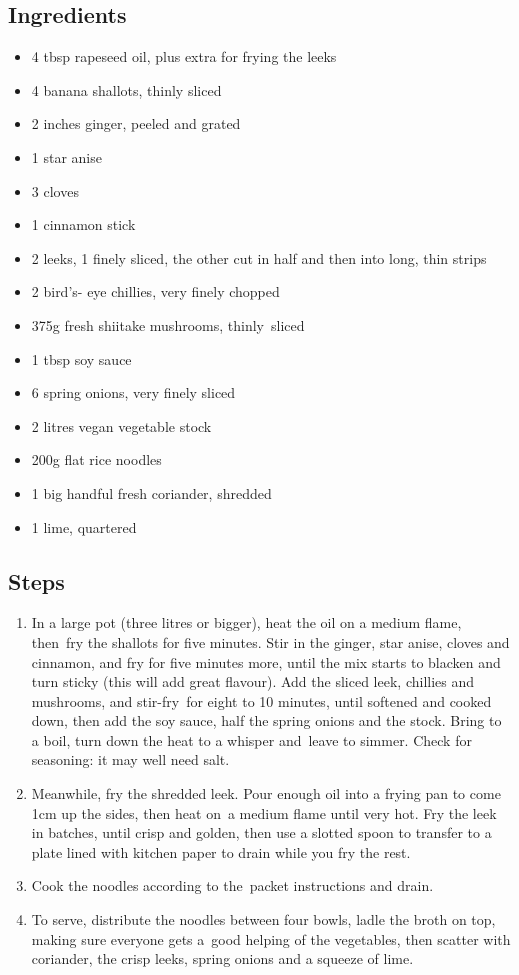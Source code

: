 \documentclass{book}
\begin{document}
\subsection*{Ingredients}
\begin{itemize}
\item 4 tbsp rapeseed oil, plus extra for frying the leeks
\item 4 banana shallots, thinly sliced 
\item 2 inches ginger, peeled and grated 
\item 1 star anise 
\item 3 cloves
\item 1 cinnamon stick 
\item 2 leeks, 1 finely sliced, the other cut in half and then into long, thin strips 
\item 2 bird’s- eye chillies, very finely chopped 
\item 375g fresh shiitake mushrooms, thinly sliced 
\item 1 tbsp soy sauce 
\item 6 spring onions, very finely sliced 
\item 2 litres vegan vegetable stock
\item 200g flat rice noodles
\item 1 big handful fresh coriander, shredded 
\item 1 lime, quartered
\end{itemize}

\subsection*{Steps}
\begin{enumerate}
\item In a large pot (three litres or bigger), heat the oil on a medium flame, then fry the shallots for five minutes. Stir in the ginger, star anise, cloves and cinnamon, and fry for five minutes more, until the mix starts to blacken and turn sticky (this will add great flavour). Add the sliced leek, chillies and mushrooms, and stir-fry for eight to 10 minutes, until softened and cooked down, then add the soy sauce, half the spring onions and the stock. Bring to a boil, turn down the heat to a whisper and leave to simmer. Check for seasoning: it may well need salt.
\item Meanwhile, fry the shredded leek. Pour enough oil into a frying pan to come 1cm up the sides, then heat on a medium flame until very hot. Fry the leek in batches, until crisp and golden, then use a slotted spoon to transfer to a plate lined with kitchen paper to drain while you fry the rest.
\item Cook the noodles according to the packet instructions and drain.
\item To serve, distribute the noodles between four bowls, ladle the broth on top, making sure everyone gets a good helping of the vegetables, then scatter with coriander, the crisp leeks, spring onions and a squeeze of lime.
\end{enumerate}
\newpage
\end{document}
